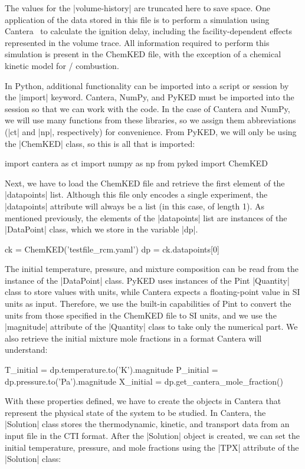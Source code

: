 \documentclass[12pt]{ijck}
\newcommand\ck{ChemKED}
\newcommand\pk{PyKED}
\begin{document}
%
The values for the \yabox|volume-history| are truncated here to save space. One application of the
data stored in this file is to perform a simulation using Cantera~\autocite{Cantera:2.3.0} to
calculate the ignition delay, including the facility-dependent effects represented in the volume
trace. All information required to perform this simulation is present in the \ck{} file, with the
exception of a chemical kinetic model for \slash {} combustion.

In Python, additional functionality can be imported into a script or session by the \pybox|import|
keyword. Cantera, NumPy, and PyKED must be imported into the session so that we can work with the
code. In the case of Cantera and NumPy, we will use many functions from these libraries, so we
assign them abbreviations (\pybox|ct| and \pybox|np|, respectively) for convenience. From PyKED, we
will only be using the \pybox|ChemKED| class, so this is all that is imported:
%
\begin{pythonbox}
import cantera as ct
import numpy as np
from pyked import ChemKED
\end{pythonbox}
%
Next, we have to load the ChemKED file and retrieve the first element of the \pybox|datapoints|
list. Although this file only encodes a single experiment, the \pybox|datapoints| attribute will
always be a list (in this case, of length 1). As mentioned previously, the elements of the
\pybox|datapoints| list are instances of the \pybox|DataPoint| class, which we store in the variable
\pybox|dp|.
%
\begin{pythonbox}
ck = ChemKED('testfile_rcm.yaml')
dp = ck.datapoints[0]
\end{pythonbox}
%
The initial temperature, pressure, and mixture composition can be read from the
instance of the \pybox|DataPoint| class. \pk{} uses instances of the Pint \pybox|Quantity| class to
store values with units, while Cantera expects a floating-point value in SI
units as input. Therefore, we use the built-in capabilities of Pint to convert
the units from those specified in the \ck{} file to SI units, and we use the \pybox|magnitude|
attribute of the \pybox|Quantity| class to take only the numerical part. We also retrieve the
initial mixture mole fractions in a format Cantera will understand:
%
\begin{pythonbox}
T_initial = dp.temperature.to('K').magnitude
P_initial = dp.pressure.to('Pa').magnitude
X_initial = dp.get_cantera_mole_fraction()
\end{pythonbox}
%
With these properties defined, we have to create the objects in Cantera that represent the physical
state of the system to be studied. In Cantera, the \pybox|Solution| class stores the thermodynamic,
kinetic, and transport data from an input file in the CTI format. After the \pybox|Solution| object
is created, we can set the initial temperature, pressure, and mole fractions using the \pybox|TPX|
attribute of the \pybox|Solution| class:
\end{document}
